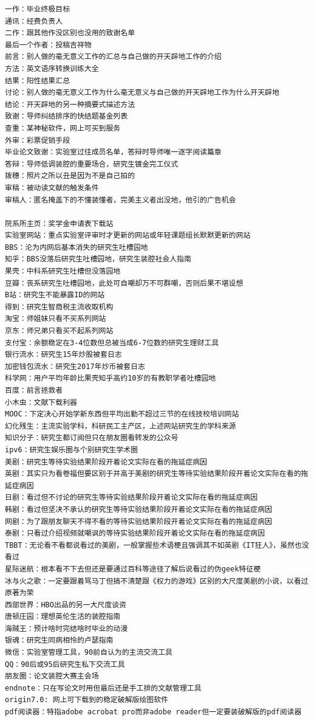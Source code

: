 \documentclass[]{book}
\begin{document}
\begin{verbatim}
一作：毕业终极目标
通讯：经费负责人
二作：跟其他作没区别也没用的致谢名单
最后一个作者：投稿吉祥物
前言：别人做的毫无意义工作的汇总与自己做的开天辟地工作的介绍
方法：英文语序转换训练大全
结果：阳性结果汇总
讨论：别人做的毫无意义工作为什么毫无意义与自己做的开天辟地工作为什么开天辟地
结论：开天辟地的另一种摘要式描述方法
致谢：导师纠结排序的快结题基金列表
查重：某神秘软件，网上可买到服务
外审：彩票促销手段
毕业论文致谢：实验室过往成员名单，答辩时导师唯一逐字阅读篇章
答辩：导师低调装腔的重要场合，研究生镀金完工仪式
拨穗：照片之所以丑是因为不是自己拍的
审稿：被动读文献的触发条件
审稿人：匿名掩盖下的不懂装懂者，完美主义者出没地，他引的广告机会

院系所主页：奖学金申请表下载站
实验室网站：重点实验室评审时才更新的网站或年轻课题组长默默更新的网站
BBS：沦为内网后基本消失的研究生吐槽园地
知乎：BBS没落后研究生吐槽园地，研究生装腔社会人指南
果壳：中科系研究生吐槽但没落园地
豆瓣：丧系研究生吐槽园地，此处可自嘲却万不可群嘲，否则后果不堪设想
B站：研究生不能暴露ID的网站
得到：研究生智商税主流收取机构
淘宝：师姐妹只看不买系列网站
京东：师兄弟只看买不起系列网站
支付宝：余额稳定在3-4位数但总被当成6-7位数的研究生理财工具
银行流水：研究生15年炒股被套日志
加密钱包流水：研究生2017年炒币被套日志
科学网：用户平均年龄比果壳知乎高约10岁的有教职学者吐槽园地
百度：前言拯救者
小木虫：文献下载利器
MOOC：下定决心开始学新东西但平均出勤不超过三节的在线技校培训网站
幻化残生：主流实验学科，科研民工主产区，上述网站研究生的学科来源
知识分子：研究生都订阅但只在朋友圈看转发的公众号
ipv6：研究生娱乐圈与个别研究生学术圈
美剧：研究生等待实验结果阶段开着论文实际在看的拖延症病因
英剧：其实只为看卷福但要区别于并高于美剧的研究生等待实验结果阶段开着论文实际在看的拖延症病因
日剧：看过但不讨论的研究生等待实验结果阶段开着论文实际在看的拖延症病因
韩剧：看过但坚决不承认的研究生等待实验结果阶段开着论文实际在看的拖延症病因
网剧：为了跟朋友聊天不得不看的等待实验结果阶段开着论文实际在看的拖延症病因
泰剧：只看过介绍视频就嘲讽的等待实验结果阶段开着论文实际在看的拖延症病因
TBBT：无论看不看都说看过的美剧，一般掌握些术语梗且强调其不如英剧《IT狂人》，虽然也没看过
星际迷航：根本看不下去但还是要通过百科等途径了解后说看过的伪geek特征梗
冰与火之歌：一定要跟着骂马丁但搞不清楚跟《权力的游戏》区别的大尺度美剧的小说，以看过原著为荣
西部世界：HBO出品的另一大尺度谈资
唐顿庄园：理想英伦生活的装腔指南
海贼王：预计啥时完结啥时毕业的动漫
银魂：研究生同病相怜的卢瑟指南
微信：实验室管理工具，90前自认为的主流交流工具
QQ：90后或95后研究生私下交流工具
朋友圈：论文装腔大赛主会场
endnote：只在写论文时用但最后还是手工排的文献管理工具
origin7.0: 网上可下载到的稳定破解版绘图软件
pdf阅读器：特指adobe acrobat pro而非adobe reader但一定要装破解版的pdf阅读器

\end{verbatim}
\end{document}
